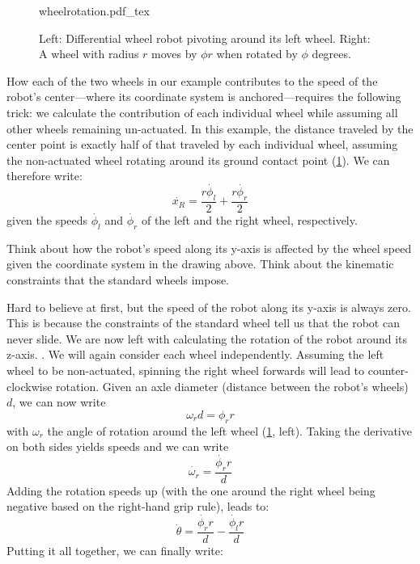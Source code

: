 \begin{figure}[htb!]
    \centering
    \def\svgwidth{0.86\textwidth}
    {wheelrotation.pdf_tex}
    \caption{Left: Differential wheel robot pivoting around its left wheel. Right: A wheel with radius $r$ moves by $\phi r$ when rotated by $\phi$ degrees.}
    \label{fig:wheelrotation}
\end{figure}



How each of the two wheels in our example contributes to the speed of the robot's center---where its coordinate system is anchored---requires the following trick: we calculate the contribution of each individual wheel while assuming all other wheels remaining un-actuated.
In this example, the distance traveled by the center point is exactly half of that traveled by each individual wheel, assuming the non-actuated wheel rotating around its ground contact point (\cref{fig:wheelrotation}). We can therefore write:
\begin{equation}
\dot{x_R}=\frac{r\dot{\phi_l}}{2}+\frac{r\dot{\phi_r}}{2}
\end{equation}
given the speeds $ \dot{\phi_l}$ and $ \dot{\phi_r}$ of the left and the right wheel, respectively.

\begin{mdframed}
Think about how the robot's speed along its y-axis is affected by the wheel speed given the coordinate system in the drawing above. Think about the kinematic constraints that the standard wheels impose.
\end{mdframed}

Hard to believe at first, but the speed of the robot along its y-axis is always zero. This is because the constraints of the standard wheel tell us that the robot can never slide.
We are now left with calculating the rotation of the robot around its z-axis.
.
We will again consider each wheel independently. Assuming the left wheel to be non-actuated, spinning the right wheel forwards will lead to counter-clockwise rotation. Given an axle diameter (distance between the robot's wheels) $d$, we can now write
\begin{equation}
\omega_r d = \phi_r r
\end{equation}
with $\omega_r$ the angle of rotation around the left wheel (\cref{fig:wheelrotation}, left). Taking the derivative on both sides yields speeds and we can write
\begin{equation}
\dot{\omega_r} = \frac{\dot{\phi_r} r}{d}
\end{equation}
Adding the rotation speeds up (with the one around the right wheel being negative based on the right-hand grip rule), leads to:
%
\begin{equation}
\dot{\theta}=\frac{\dot{\phi_r} r}{d}-\frac{\dot{\phi_l} r}{d}
\end{equation}
%
Putting it all together, we can finally write:

